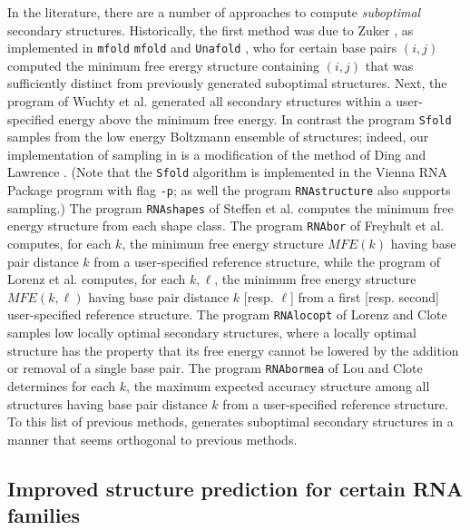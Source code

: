 In the literature, there are a number of approaches to compute
{\em suboptimal} secondary structures. Historically, the first
method was due to Zuker \cite{Zuk89a}, as implemented in {\tt mfold}
{\tt mfold} \cite{Zuk89a} and {\tt Unafold} \cite{Markham.mmb08},
who for certain base pairs $(i,j)$ computed the minimum
free erergy structure containing $(i,j)$ that was sufficiently distinct
from previously generated suboptimal structures.
Next, the program \rnasub of Wuchty et al.
\cite{wuchtyFontanaHofackerSchuster} generated all secondary structures
within a user-specified energy above the minimum free energy.
In contrast the program {\tt Sfold} \cite{Ding.nar03} samples from
the low energy Boltzmann ensemble of structures; indeed, our implementation
of sampling in {\rnahairpin} is a modification of the method of
Ding and Lawrence \cite{Ding.nar03}. (Note that the {\tt Sfold} algorithm
is implemented in the Vienna RNA Package program
\rnasub with flag {\tt -p}; as well the program
{\tt RNAstructure} \cite{mathewsConstraints} also supports sampling.)
The program {\tt RNAshapes} of Steffen et al.
\cite{giegerich:shapesBioinf} computes the minimum free energy structure
from each shape class.
The program {\tt RNAbor} of Freyhult et al. \cite{Freyhult.b07}
computes, for each $k$,
the minimum free energy structure $MFE(k)$ having base pair
distance $k$ from a user-specified reference structure, while the
program \rnatwofold of Lorenz et al. \cite{hofacker:RNAbor2D}
computes, for each $k,\ell$, the minimum free energy structure
$MFE(k,\ell)$ having base pair
distance $k$ [resp. $\ell$] from a first [resp. second]
user-specified reference structure.
The program {\tt RNAlocopt} of Lorenz and Clote  \cite{RNAlocopt}
samples low  locally optimal secondary structures, where a locally
optimal structure has the property that its free energy cannot be lowered
by the addition or removal of a single base pair. The program
{\tt RNAbormea} of Lou and Clote \cite{Clote.bb12} determines
for each $k$, the maximum expected accuracy structure among all structures
having base pair distance $k$ from a user-specified reference structure.
To this list of previous methods, {\rnahairpin} generates suboptimal
secondary structures in a manner that seems orthogonal to previous methods.

\subsection{Improved structure prediction for certain RNA families}


